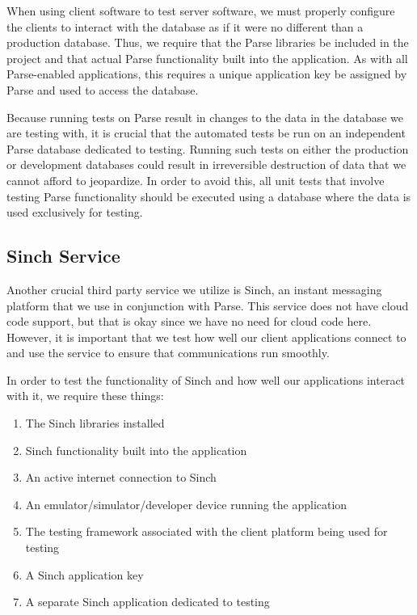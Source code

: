 When using client software to test server software, we must properly configure
the clients to interact with the database as if it were no different than a
production database. Thus, we require that the Parse libraries be included in
the project and that actual Parse functionality built into the application. As
with all Parse-enabled applications, this requires a unique application key be
assigned by Parse and used to access the database.

Because running tests on Parse result in changes to the data in the database we
are testing with, it is crucial that the automated tests be run on an
independent Parse database dedicated to testing. Running such tests on either
the production or development databases could result in irreversible destruction
of data that we cannot afford to jeopardize. In order to avoid this, all unit
tests that involve testing Parse functionality should be executed using a
database where the data is used exclusively for testing.


\subsection{Sinch Service}

Another crucial third party service we utilize is Sinch, an instant messaging
platform that we use in conjunction with Parse. This service does not have cloud
code support, but that is okay since we have no need for cloud code here.
However, it is important that we test how well our client applications connect
to and use the service to ensure that communications run smoothly.

In order to test the functionality of Sinch and how well our applications
interact with it, we require these things:

\begin{enumerate}
	\item The Sinch libraries installed
	\item Sinch functionality built into the application
	\item An active internet connection to Sinch
	\item An emulator/simulator/developer device running the application
	\item The testing framework associated with the client platform being used
	for testing
	\item A Sinch application key
	\item A separate Sinch application dedicated to testing
\end{enumerate}

